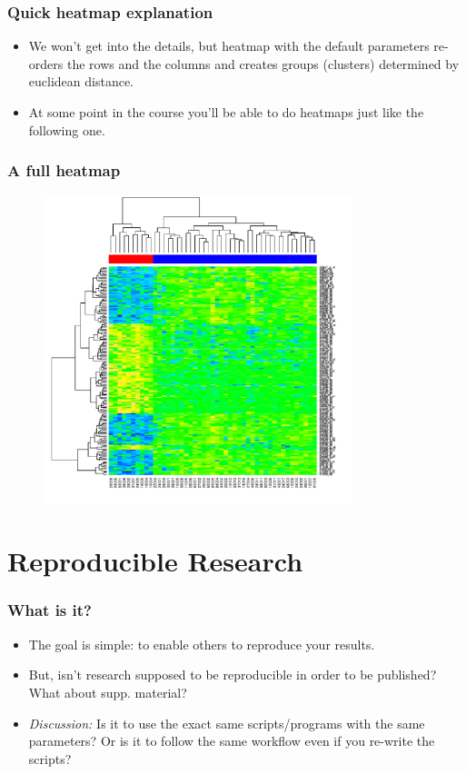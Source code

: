 \begin{frame}[allowframebreaks]
  \frametitle{Quick heatmap explanation}
  \begin{itemize}
  \item We won't get into the details, but heatmap with the default parameters re-orders the rows and the columns and creates groups (clusters) determined by euclidean distance.
  \item At some point in the course you'll be able to do heatmaps just like the following one.
  \end{itemize}
\end{frame}

\begin{frame}[fragile]  
  \frametitle{A full heatmap}
  \begin{figure}
  \centering
  \includegraphics[width=0.8\textwidth, height=0.9\textheight]{heatmap}
  \end{figure}
\end{frame}

\section{Reproducible Research}

\begin{frame}[allowframebreaks]
  \frametitle{What is it?}
  \begin{itemize}
  \item The goal is simple: to enable others to reproduce your results.
  \item But, isn't research supposed to be reproducible in order to be published? What about supp. material?
  \item \emph{Discussion:} Is it to use the exact same scripts/programs with the same parameters? Or is it to follow the same workflow even if you re-write the scripts?
  \end{itemize}
\end{frame}

